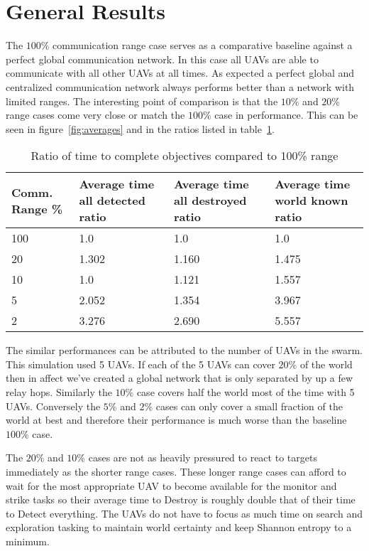 \section{General Results}

The $100\%$ communication range case serves as a comparative baseline against a perfect global communication network.  In this case all UAVs are able to communicate with all other UAVs at all times.  As expected a perfect global and centralized communication network always performs better than a network with limited ranges.  The interesting point of comparison is that the $10\%$ and $20\%$ range cases come very close or match the $100\%$ case in performance.  This can be seen in figure~\ref{fig:averages} and in the ratios listed in table~\ref{tab:avgResultsRatio}.

\begin{table}[H]
	\caption{Ratio of time to complete objectives compared to 100\% range}
	\centering
	\label{tab:avgResultsRatio}
	\begin{tabular}{|p{1.25cm}|p{1.5cm}|p{1.75cm}|p{1.5cm}|}
		\hline
		Comm. Range \% & Average time all detected ratio & Average time all destroyed ratio & Average time world known ratio\\
		\hline
		100 & 1.0   & 1.0   & 1.0  \\ \hline
		20  & 1.302 & 1.160 & 1.475  \\ \hline
		10  & 1.0   & 1.121 & 1.557  \\ \hline
		5   & 2.052 & 1.354 & 3.967 \\ \hline
		2   & 3.276 & 2.690 & 5.557 \\ \hline
	\end{tabular}
\end{table}

The similar performances can be attributed to the number of UAVs in the swarm.  This simulation used 5 UAVs.  If each of the 5 UAVs can cover $20\%$ of the world then in affect we've created a global network that is only separated by up a few relay hops.  Similarly the $10\%$ case covers half the world most of the time with 5 UAVs.  Conversely the $5\%$ and $2\%$ cases can only cover a small fraction of the world at best and therefore their performance is much worse than the baseline $100\%$ case.



The $20\%$ and $10\%$ cases are not as heavily pressured to react to targets immediately as the shorter range cases.  These longer range cases can afford to wait for the most appropriate UAV to become available for the monitor and strike tasks so their average time to Destroy is roughly double that of their time to Detect everything.  The UAVs do not have to focus as much time on search and exploration tasking to maintain world certainty and keep Shannon entropy to a minimum.

